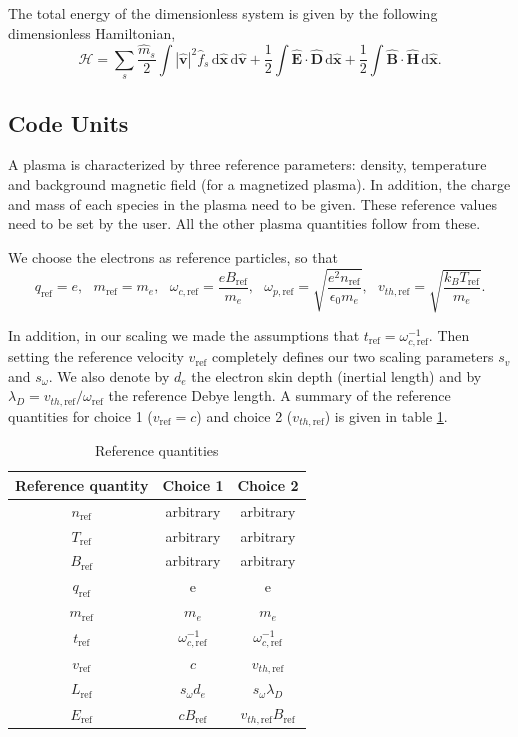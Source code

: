 \documentclass[english]{article}
\newcommand{\bx}{\textbf{x}}
\newcommand{\bv}{\textbf{v}}
\newcommand{\bB}{\textbf{B}}
\newcommand{\bH}{\textbf{H}}
\newcommand{\bE}{\textbf{E}}
\newcommand{\bD}{\textbf{D}}
\newcommand{\du}{\,\mathrm{d}}
\newcommand{\tr}{t_{\mathrm{ref}}}
\newcommand{\xr}{L_{\mathrm{ref}}}
\newcommand{\nr}{n_{\mathrm{ref}}}
\newcommand{\qr}{q_{\mathrm{ref}}}
\newcommand{\Tr}{T_{\mathrm{ref}}}
\newcommand{\mr}{m_{\mathrm{ref}}}
\newcommand{\Br}{B_{\mathrm{ref}}}
\newcommand{\Er}{E_{\mathrm{ref}}}
\newcommand{\vr}{v_{\mathrm{ref}}}
\newcommand{\vthr}{v_{th,\mathrm{ref}}}
\newcommand{\omr}{\omega_{\mathrm{ref}}}
\newcommand{\ompr}{\omega_{p,\mathrm{ref}}}
\newcommand{\omcr}{\omega_{c,\mathrm{ref}}}
\newcommand{\xht}{\hat{\bx}}
\newcommand{\vht}{\hat{\bv}}
\newcommand{\mht}{\hat{m}}
\newcommand{\Eht}{\hat{\bE}}
\newcommand{\Dht}{\hat{\bD}}
\newcommand{\Bht}{\hat{\bB}}
\newcommand{\Hht}{\hat{\bH}}
\newcommand{\fht}{\hat{f}}
\begin{document}
The total energy of the dimensionless system is given by the following dimensionless Hamiltonian,
\begin{equation}\label{eq:hamiltoniant}
	\mathcal{H}=\sum_s\frac{\mht_s}{2}\int |\vht|^2 \fht_s \du\xht \du\vht + \frac{1}{2} \int \Eht \cdot \Dht \du\xht + \frac{1}{2} \int \Bht \cdot \Hht \du\xht.
\end{equation}

\subsection{Code Units}

A plasma is characterized by three reference parameters: density, temperature and background magnetic field (for a magnetized plasma). In addition, the charge and mass of each species in the plasma need to be given. These reference values need to be set by the user. All the other plasma quantities follow from these.

We choose the electrons as reference particles, so that
$$\qr = e, ~~~ \mr=m_e, ~~~ \omcr=\frac{e\Br}{m_e}, ~~~ \ompr=\sqrt{\frac{e^2\nr}{\epsilon_0m_e}}, ~~~ \vthr= \sqrt{\frac{k_B \Tr}{m_e}} .$$

In addition, in our scaling we made the assumptions that $\tr = \omcr^{-1}$.
Then setting the reference velocity $\vr$ completely defines our two scaling parameters $s_v$ and $s_\omega$.
We also denote by $d_e$ the electron skin depth (inertial length) and by
$\lambda_D=\vthr/\omr$ the reference Debye length.
A summary of the reference quantities for choice 1 ($\vr=c$) and choice 2 ($\vthr$) is given in table \ref{tab:refq}.

\begin{table}[htbp]
	\caption{Reference quantities \label{tab:refq}}
	\centering\begin{tabular}{c|c|c}
		Reference quantity & Choice 1       & Choice 2             \\ \hline
		$\nr$              & arbitrary      & arbitrary            \\
		$\Tr$              & arbitrary      & arbitrary            \\
		$\Br$              & arbitrary      & arbitrary            \\
		$\qr$              & e              & e                    \\
		$\mr$              & $m_e$          & $m_e$                \\
		$\tr$              & $ \omcr^{-1}$  & $ \omcr^{-1}$        \\
		$\vr$              & $c$            & $\vthr$              \\
		$\xr$              & $s_\omega d_e$ & $s_\omega \lambda_D$ \\
		$\Er$              & $c\Br$         & $\vthr\Br$           \\
	\end{tabular}
\end{table}
\end{document}
